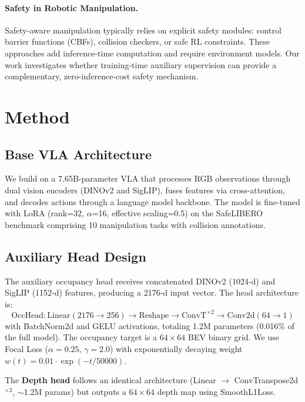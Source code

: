 \documentclass[10pt,letterpaper]{article}
\begin{document}
\paragraph{Safety in Robotic Manipulation.}
Safety-aware manipulation typically relies on explicit safety modules: control barrier functions (CBFs), collision checkers, or safe RL constraints. These approaches add inference-time computation and require environment models. Our work investigates whether training-time auxiliary supervision can provide a complementary, zero-inference-cost safety mechanism.

\section{Method}
\label{sec:method}

\subsection{Base VLA Architecture}
We build on a 7.65B-parameter VLA that processes RGB observations through dual vision encoders (DINOv2 and SigLIP), fuses features via cross-attention, and decodes actions through a language model backbone. The model is fine-tuned with LoRA (rank=32, $\alpha$=16, effective scaling=0.5) on the SafeLIBERO benchmark comprising 10 manipulation tasks with collision annotations.

\subsection{Auxiliary Head Design}
\label{sec:aux_head}

The auxiliary occupancy head receives concatenated DINOv2 (1024-d) and SigLIP (1152-d) features, producing a 2176-d input vector. The head architecture is:
\begin{equation}
  \text{OccHead}: \text{Linear}(2176 \!\to\! 256) \to \text{Reshape} \to \text{ConvT}^{\times 2} \to \text{Conv2d}(64 \!\to\! 1)
\end{equation}
with BatchNorm2d and GELU activations, totaling 1.2M parameters (0.016\% of the full model). The occupancy target is a $64\!\times\!64$ BEV binary grid. We use Focal Loss ($\alpha\!=\!0.25$, $\gamma\!=\!2.0$) with exponentially decaying weight $w(t) = 0.01 \cdot \exp(-t/50000)$.

The \textbf{Depth head} follows an identical architecture (Linear $\to$ ConvTranspose2d$^{\times 2}$, ${\sim}$1.2M params) but outputs a $64\!\times\!64$ depth map using SmoothL1Loss.
\end{document}
